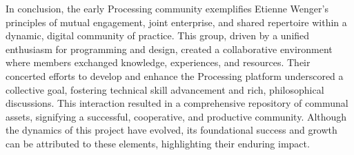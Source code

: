In conclusion, the early Processing community exemplifies Etienne Wenger's principles of mutual engagement, joint enterprise, and shared repertoire within a dynamic, digital community of practice. This group, driven by a unified enthusiasm for programming and design, created a collaborative environment where members exchanged knowledge, experiences, and resources. Their concerted efforts to develop and enhance the Processing platform underscored a collective goal, fostering technical skill advancement and rich, philosophical discussions. This interaction resulted in a comprehensive repository of communal assets, signifying a successful, cooperative, and productive community. Although the dynamics of this project have evolved, its foundational success and growth can be attributed to these elements, highlighting their enduring impact.







%
%
%
%